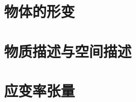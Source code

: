 \documentclass[zihao=-4,linespread=1.5,a4paper,heading=true,twoside]{ctexbook}
\theoremstyle{definition}
\theoremstyle{plain}
\begin{document}
\section{物体的形变}


\section{物质描述与空间描述}


\section{应变率张量}










\end{document}
